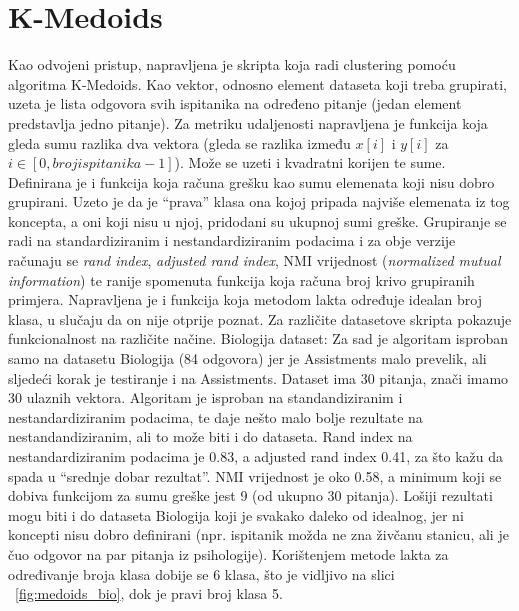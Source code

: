 \section{K-Medoids}
Kao odvojeni pristup, napravljena je skripta koja radi clustering pomoću algoritma K-Medoids.\newline
Kao vektor, odnosno element dataseta koji treba grupirati, uzeta je lista odgovora svih ispitanika na određeno pitanje (jedan element predstavlja jedno pitanje). Za metriku udaljenosti napravljena je funkcija koja gleda sumu razlika dva vektora (gleda se razlika između $x[i]$ i $y[i]$ za $i \in [0, broj ispitanika-1]$). Može se uzeti i kvadratni korijen te sume.\newline
Definirana je i funkcija koja računa grešku kao sumu elemenata koji nisu dobro grupirani. Uzeto je da je “prava” klasa ona kojoj pripada najviše elemenata iz tog koncepta, a oni koji nisu u njoj, pridodani su ukupnoj sumi greške. 
Grupiranje se radi na standardiziranim i nestandardiziranim podacima i za obje verzije računaju se \textit{rand index}, \textit{adjusted rand index}, NMI vrijednost (\textit{normalized mutual information}) te ranije spomenuta funkcija koja računa broj krivo grupiranih primjera.\newline
Napravljena je i funkcija koja metodom lakta određuje idealan broj klasa, u slučaju da on nije otprije poznat.
\newline
\newline
Za različite datasetove skripta pokazuje funkcionalnost na različite načine.\newline
Biologija dataset:\newline
Za sad je algoritam isproban samo na datasetu Biologija (84 odgovora) jer je Assistments malo prevelik, ali sljedeći korak je testiranje i na Assistments.\newline
Dataset ima 30 pitanja, znači imamo 30 ulaznih vektora. Algoritam je isproban na standandiziranim i nestandardiziranim podacima, te daje nešto malo bolje rezultate na nestandandiziranim, ali to može biti i do dataseta. 
Rand index na nestandardiziranim podacima je 0.83, a adjusted rand index 0.41, za što kažu da spada u “srednje dobar rezultat”. NMI vrijednost je oko 0.58, a minimum koji se dobiva funkcijom za sumu greške jest 9 (od ukupno 30 pitanja). Lošiji rezultati mogu biti i do dataseta Biologija koji je svakako daleko od idealnog, jer ni koncepti nisu dobro definirani (npr. ispitanik možda ne zna živčanu stanicu, ali je čuo odgovor na par pitanja iz psihologije). 
Korištenjem metode lakta za određivanje broja klasa dobije se 6 klasa, što je vidljivo na slici ~\ref{fig:medoids_bio}, dok je pravi broj klasa 5.

